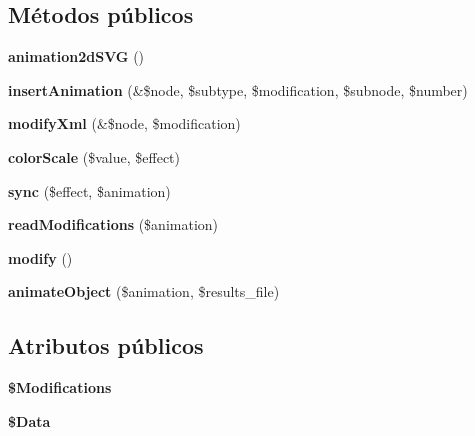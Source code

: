 \subsection*{\-Métodos públicos}
\begin{DoxyCompactItemize}
\item 
\hypertarget{classanimation2dSVG_a68840e06d9ee91727b58fb24d4895a76}{{\bfseries animation2d\-S\-V\-G} ()}\label{classanimation2dSVG_a68840e06d9ee91727b58fb24d4895a76}

\item 
\hypertarget{classanimation2dSVG_a67a7d085dc5539985c51b47462c1bacb}{{\bfseries insert\-Animation} (\&\$node, \$subtype, \$modification, \$subnode, \$number)}\label{classanimation2dSVG_a67a7d085dc5539985c51b47462c1bacb}

\item 
\hypertarget{classanimation2dSVG_a7e22d227c8cea32004cafcb402ea5801}{{\bfseries modify\-Xml} (\&\$node, \$modification)}\label{classanimation2dSVG_a7e22d227c8cea32004cafcb402ea5801}

\item 
\hypertarget{classanimation2dSVG_a2bc54dba4115d1f3a42a8cddd0e6c911}{{\bfseries color\-Scale} (\$value, \$effect)}\label{classanimation2dSVG_a2bc54dba4115d1f3a42a8cddd0e6c911}

\item 
\hypertarget{classanimation2dSVG_a60d4e6ce688357f0fe9d687422f21de5}{{\bfseries sync} (\$effect, \$animation)}\label{classanimation2dSVG_a60d4e6ce688357f0fe9d687422f21de5}

\item 
\hypertarget{classanimation2dSVG_a689f583016a3bc58880fef08f3de58f3}{{\bfseries read\-Modifications} (\$animation)}\label{classanimation2dSVG_a689f583016a3bc58880fef08f3de58f3}

\item 
\hypertarget{classanimation2dSVG_aa1d3f24de8e661f2d95d719631ed3d1f}{{\bfseries modify} ()}\label{classanimation2dSVG_aa1d3f24de8e661f2d95d719631ed3d1f}

\item 
\hypertarget{classanimation2dSVG_aa30d2a69e19e0b6a4473976d58a70a66}{{\bfseries animate\-Object} (\$animation, \$results\-\_\-file)}\label{classanimation2dSVG_aa30d2a69e19e0b6a4473976d58a70a66}

\end{DoxyCompactItemize}
\subsection*{\-Atributos públicos}
\begin{DoxyCompactItemize}
\item 
\hypertarget{classanimation2dSVG_a92cc9fb81ca29815fa76edc77d08e59c}{{\bfseries \$\-Modifications}}\label{classanimation2dSVG_a92cc9fb81ca29815fa76edc77d08e59c}

\item 
\hypertarget{classanimation2dSVG_a728b33062ec679ebba4d1fc087658a51}{{\bfseries \$\-Data}}\label{classanimation2dSVG_a728b33062ec679ebba4d1fc087658a51}

\end{DoxyCompactItemize}


